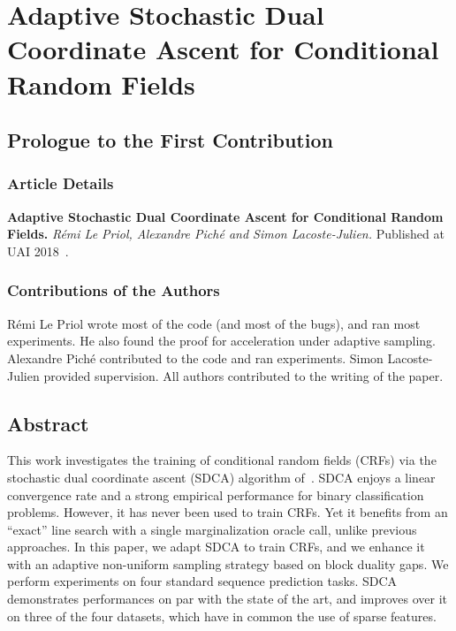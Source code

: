 \setcounter{theorem}{0}

\def\balpha{\boldsymbol{\alpha}}
\def\bmu{\boldsymbol{\mu}}
\def\bw{\boldsymbol{w}}
\newcommand{\bu}{\bm u}
\newcommand{\bv}{\bm v}
\newcommand{\strgconvex}{\mu}
\newcommand{\QM}{QM} %


\chapter{Adaptive Stochastic Dual Coordinate Ascent for Conditional Random Fields}
\label{ch:sdca}

\section{Prologue to the First Contribution}

\subsection{Article Details}

\textbf{Adaptive Stochastic Dual Coordinate Ascent for Conditional Random Fields.} 
\emph{R\'emi Le Priol, Alexandre Pich\'e and Simon Lacoste-Julien.} 
Published at UAI 2018~\citep{lepriol2018adaptive}.

\subsection{Contributions of the Authors}
Rémi Le Priol wrote most of the code (and most of the bugs), and ran most experiments. 
He also found the proof for acceleration under adaptive sampling.
Alexandre Piché contributed to the code and ran experiments.
Simon Lacoste-Julien provided supervision.
All authors contributed to the writing of the paper.

 \section{Abstract}
This work investigates the training of conditional random fields (CRFs) via the stochastic dual coordinate ascent (SDCA) algorithm of~\citet{shalev2016accelerated}.
SDCA enjoys a linear convergence rate and a strong empirical performance for binary classification problems.
However, it has never been used to train CRFs.
Yet it benefits from an ``exact'' line search with a single marginalization oracle call, unlike previous approaches.
In this paper, we adapt SDCA to train CRFs, and we enhance it with an adaptive non-uniform sampling strategy based on block duality gaps.
We perform experiments on four standard sequence prediction tasks.
SDCA demonstrates performances on par with the state of the art, and improves over it on three of the four datasets, which have in common the use of sparse features.

